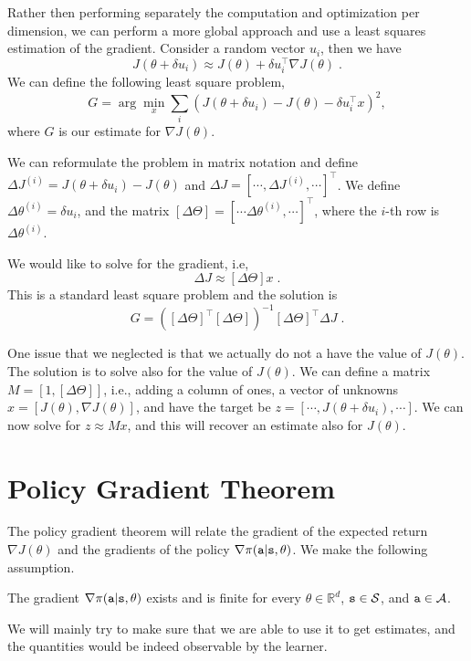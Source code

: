 Rather then performing separately the computation and optimization per dimension, we can perform a more global approach and use a least squares estimation of the gradient.
Consider a random vector $u_i$, then we have
\[
J(\theta+\delta u_i)\approx J(\theta)+\delta u_i^\top \nabla
J(\theta) \;.
\]
We can define the following least square problem,
\[
G= \arg\min_x \sum_i (J(\theta+\delta u_i)- J(\theta)-\delta
u_i^\top x)^2,
\]
where $G$ is our estimate for $\nabla J(\theta)$.

We can reformulate the problem in matrix notation and define $\Delta
J^{(i)}=J(\theta+\delta u_i)- J(\theta)$ and $\Delta J= [\cdots ,
\Delta J^{(i)}, \cdots]^\top$. We define $\Delta \theta^{(i)}=\delta
u_i$, and the matrix $[\Delta\Theta]=[\cdots
\Delta\theta^{(i)},\cdots]^\top$, where the $i$-th row is
$\Delta\theta^{(i)}$.

We would like to solve for the gradient, i.e,
\[
\Delta J\approx [\Delta \Theta]x\;.
\]
This is a standard least square problem and the solution is
\[
G=([\Delta \Theta]^\top [\Delta \Theta])^{-1} [\Delta\Theta]^\top
\Delta J\;.
\]

One issue that we neglected is that we actually do not a have the
value of $J(\theta)$. The solution is to solve also for the value of
$J(\theta)$.
%
We can define a matrix $M=[1, [\Delta\Theta]]$, i.e., adding a column of ones, a vector of unknowns $x=[J(\theta), \nabla J(\theta)]$, and have the target be $z=[\cdots, J(\theta+\delta u_i),\cdots]$. We can now solve for $z\approx Mx$, and this will recover an estimate also for $J(\theta)$.


\section{Policy Gradient Theorem}

The policy gradient theorem will relate the gradient of the expected
return $\nabla J(\theta)$ and the gradients of the policy $\nabla
\pi({\tt a}|{\tt s},\theta)$. We make the following assumption.
\begin{assumption}\label{ass:differentiable_policy}
The gradient $\nabla
\pi({\tt a}|{\tt s},\theta)$ exists and is finite for every $\theta \in \mathbb{R}^d$, ${\tt s} \in \mathcal{S}$, and ${\tt a} \in \mathcal{A}$.
\end{assumption}

We will mainly try to make sure
that we are able to use it to get estimates, and the quantities
would be indeed observable by the learner.

